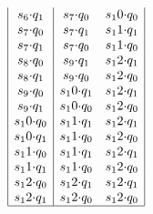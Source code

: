 \documentclass[12pt]{article}
\begin{document}
\begin{tcolorbox}
\begin{itemize}[leftmargin=*]
$$\begin{array}{|c|cc|}
     s_6{\cdot}q_1 & s_7{\cdot}q_0 & s_10{\cdot}q_0\\
     s_7{\cdot}q_0 & s_7{\cdot}q_1 & s_11{\cdot}q_1\\
     s_7{\cdot}q_1 & s_7{\cdot}q_0 & s_11{\cdot}q_0\\
     s_8{\cdot}q_0 & s_9{\cdot}q_1 & s_12{\cdot}q_1\\
     s_8{\cdot}q_1 & s_9{\cdot}q_0 & s_12{\cdot}q_0\\
     s_9{\cdot}q_0 & s_10{\cdot}q_1 & s_12{\cdot}q_1\\
     s_9{\cdot}q_1 & s_10{\cdot}q_0 & s_12{\cdot}q_0\\
     s_10{\cdot}q_0 & s_11{\cdot}q_1 & s_12{\cdot}q_1\\
     s_10{\cdot}q_1 & s_11{\cdot}q_0 & s_12{\cdot}q_0\\
     s_11{\cdot}q_0 & s_11{\cdot}q_1 & s_12{\cdot}q_1\\
     s_11{\cdot}q_1 & s_11{\cdot}q_0 & s_12{\cdot}q_0\\
     s_12{\cdot}q_0 & s_12{\cdot}q_1 & s_12{\cdot}q_1\\
     s_12{\cdot}q_1 & s_12{\cdot}q_0 & s_12{\cdot}q_0\\
     \hline
    \end{array}$$
 \end{itemize}
\end{tcolorbox}\bigskip
\end{document}
